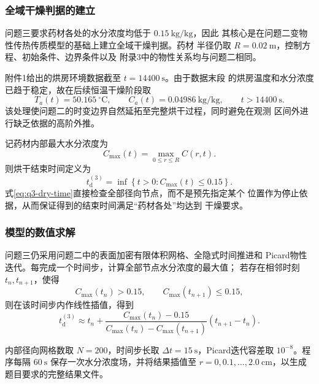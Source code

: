 \documentclass[12pt,a4paper]{article}
\renewcommand{\boxed}[1]{#1}
\begin{document}
\subsubsection{全域干燥判据的建立}

问题三要求药材各处的水分浓度均低于 $0.15\ \mathrm{kg/kg}$，因此
其核心是在问题二变物性传热传质模型的基础上建立全域干燥判据。药材
半径仍取 $R=0.02\ \mathrm{m}$，控制方程、初始条件、边界条件以及
附录3中的物性关系均与问题二相同。

附件1给出的烘房环境数据截至 $t=14400\ \mathrm{s}$。由于数据末段
的烘房温度和水分浓度已趋于稳定，故在后续恒温干燥阶段取
\begin{equation}
T_a(t)=50.165\ ^\circ\mathrm{C},\qquad
C_a(t)=0.04986\ \mathrm{kg/kg},\qquad t>14400\ \mathrm{s}.
\label{eq:q3-environment-extension}
\end{equation}
该处理使问题二的时变边界自然延拓至完整烘干过程，同时避免在观测
区间外进行缺乏依据的高阶外推。

记药材内部最大水分浓度为
\begin{equation}
C_{\max}(t)=\max_{0\leq r\leq R}C(r,t).
\label{eq:q3-cmax}
\end{equation}
则烘干结束时间定义为
\begin{equation}
\boxed{
t_{\mathrm d}^{(3)}
=\inf\left\{t>0:C_{\max}(t)\leq0.15\right\}
}.
\label{eq:q3-dry-time}
\end{equation}
式\eqref{eq:q3-dry-time}直接检查全部径向节点，而不是预先指定某个
位置作为停止依据，从而保证得到的结束时间满足“药材各处”均达到
干燥要求。

\subsubsection{模型的数值求解}

问题三仍采用问题二中的表面加密有限体积网格、全隐式时间推进和
Picard物性迭代。每完成一个时间步，计算全部节点水分浓度的最大值；
若存在相邻时刻 $t_n,t_{n+1}$，使得
\begin{equation}
C_{\max}(t_n)>0.15,\qquad
C_{\max}(t_{n+1})\leq0.15,
\end{equation}
则在该时间步内作线性插值，得到
\begin{equation}
t_{\mathrm d}^{(3)}
\approx t_n+
\frac{C_{\max}(t_n)-0.15}
{C_{\max}(t_n)-C_{\max}(t_{n+1})}
(t_{n+1}-t_n).
\label{eq:q3-time-interpolation}
\end{equation}

内部径向网格数取 $N=200$，时间步长取
$\Delta t=15\ \mathrm{s}$，Picard迭代容差取 $10^{-8}$。程序每隔
$60\ \mathrm{s}$ 保存一次水分浓度场，并将结果插值至
$r=0,0.1,\ldots,2.0\ \mathrm{cm}$，以生成题目要求的完整结果文件。
\end{document}
